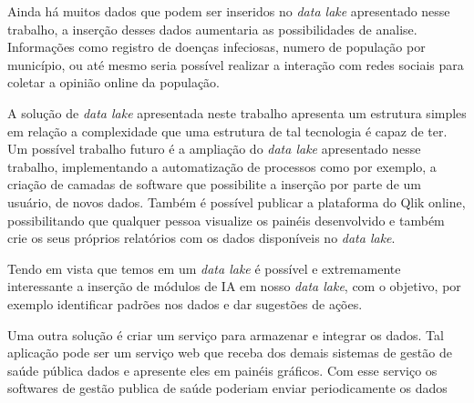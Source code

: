 \documentclass[
	12pt,				%
	openright,			%
	oneside,			%
	a4paper,			%
	chapter=TITLE,		%
	section=TITLE,		%
	subsection=TITLE,	%
	subsubsection=TITLE,%
	english,			%
	brazil				%
	]{abntex2}
\theoremstyle{definition}
\begin{document}
    \begin{description}[font=$\bullet$~\normalfont\scshape\color{black!50!black}]
    
    \item [Ampliação do \textit{data lake}] Ainda há muitos dados que podem ser inseridos no \textit{data lake} apresentado nesse trabalho, a inserção desses dados aumentaria as possibilidades de analise. Informações como registro de doenças infeciosas, numero de população por município, ou até mesmo seria possível realizar a interação com redes sociais para coletar a opinião online da população.
    
    \item [Automação do \textit{data lake}] A solução de \textit{data lake} apresentada neste trabalho apresenta um estrutura simples em relação a complexidade que uma estrutura de tal tecnologia é capaz de ter. Um possível trabalho futuro é a ampliação do \textit{data lake} apresentado nesse trabalho, implementando a automatização de processos como por exemplo, a criação de camadas de software que possibilite a inserção por parte de um usuário, de novos dados. Também é possível publicar a plataforma do Qlik online, possibilitando que qualquer pessoa visualize os painéis desenvolvido e também crie os seus próprios relatórios com os dados disponíveis no \textit{data lake}.
    
    \item [Inserção de modulos de inteligência artificial (IA) no \textit{data lake}] Tendo em vista que temos em um \textit{data lake} é possível e extremamente interessante a inserção de módulos de IA em nosso \textit{data lake}, com o objetivo, por exemplo identificar padrões nos dados e dar sugestões de ações.
    
    \item [Criação de serviço integrado] Uma outra solução é criar um serviço para armazenar e integrar os dados. Tal aplicação pode ser um serviço web que receba dos demais sistemas de gestão de saúde pública dados e apresente eles em painéis gráficos. Com esse serviço os softwares de gestão publica de saúde poderiam enviar periodicamente os dados 
    
    \end{description}
\postextual



\end{document}
